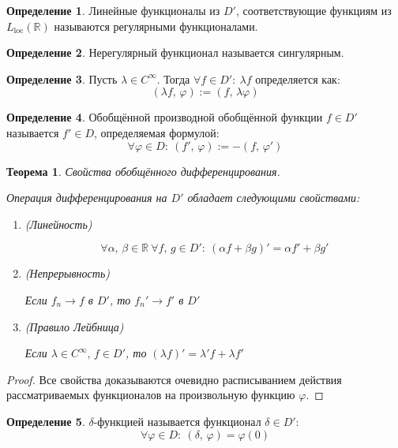 \documentclass[a4paper,12pt]{article}
\renewcommand{\phi}{\ensuremath{\varphi}}
\theoremstyle{plain}
\newtheorem{theorem}{Теорема}[section]
\theoremstyle{definition}
\newtheorem{definition}{Определение}[section]
\theoremstyle{remark}
\begin{document}
\begin{definition}
	Линейные функционалы из $D'$, соответствующие функциям из $L_{\text{loc}}(\mathbb{R})$ называются регулярными функционалами.
\end{definition}

\begin{definition}
	Нерегулярный функционал называется сингулярным.
\end{definition}

\begin{definition}
	Пусть $\lambda \in C^\infty$. Тогда $\forall f \in D':\: \lambda f$ определяется как:
	\[(\lambda f,\, \phi) := (f,\, \lambda\phi)\]
\end{definition}

\begin{definition}
	Обобщённой производной обобщённой функции $f \in D'$ называется $f' \in D$, определяемая формулой:
	\[\forall \phi \in D:\: (f',\, \phi) := -(f,\, \phi')\]
\end{definition}

\begin{theorem}
	Свойства обобщённого дифференцирования.

	Операция дифференцирования на $D'$ обладает следующими свойствами:
	\begin{enumerate}
		\item (Линейность)

		      \[\forall \alpha,\, \beta \in \mathbb{R} \: \forall f,\, g \in D':\: (\alpha f + \beta g)' = \alpha f' + \beta g'\]
		\item (Непрерывность)

		      Если $f_n \to f$ в $D'$, то $f_n' \to f'$ в $D'$
		\item (Правило Лейбница)

		      Если $\lambda \in C^\infty,\, f \in D'$, то $(\lambda f)' = \lambda' f + \lambda f'$
	\end{enumerate}
\end{theorem}

\begin{proof}
	Все свойства доказываются очевидно расписыванием действия рассматриваемых функционалов на произвольную функцию $\phi$.
\end{proof}

\begin{definition}
	$\delta$-функцией называется функционал $\delta \in D'$:
	\[\forall \phi \in D:\: (\delta,\, \phi) = \phi(0)\]
\end{definition}
\end{document}
